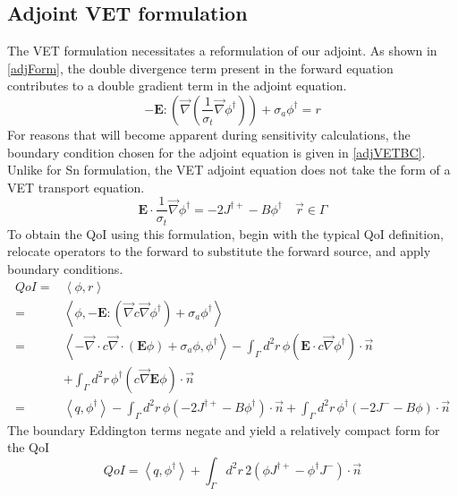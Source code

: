 \documentclass{article}
\newcommand{\vr}{\vec{r}}
\newcommand{\bra}{\left\langle}
\newcommand{\ket}{\right\rangle}
\newcommand{\vdiv}{\vec{\nabla} \cdot}
\newcommand{\vgrad}{\vec{\nabla}}
\newcommand{\Edd}{\mathbf{E}}
\newcommand{\sigt}{\sigma_t}
\newcommand{\siga}{\sigma_a}
\newcommand{\isigt}{c}
\newcommand{\scalSource}{q}
\newcommand{\scalResp}{r}
\begin{document}
\subsection{Adjoint VET formulation}
The VET formulation necessitates a reformulation of our adjoint. As shown in \ref{adjForm}, the double divergence term present in the forward equation contributes to a double gradient term in the adjoint equation.
\begin{equation}
\label{adjForm}
- \Edd : \left( \vgrad \left( \frac{1}{\sigt}\vgrad \phi^\dag \right) \right) + \siga \phi^\dag = \scalResp
\end{equation}
For reasons that will become apparent during sensitivity calculations, the boundary condition chosen for the adjoint equation is given in \ref{adjVETBC}. Unlike for Sn formulation, the VET adjoint equation does not take the form of a VET transport equation.
\begin{equation}
\label{adjVETBC}
\Edd \cdot \frac{1}{\sigma_{t} } \vec{\nabla} \phi^\dag  = - 2J^{\dag +} - B \phi^\dag \quad \vr \in \Gamma
\end{equation}
To obtain the QoI using this formulation, begin with the typical QoI definition, relocate operators to the forward to substitute the forward source, and apply boundary conditions.
\begin{equation}
\label{VETQoIAdjUnpDeriv}
\begin{split}
QoI=&\bra \phi , \scalResp \ket \\
=&\bra \phi , - \Edd : \left( \vgrad \isigt \vgrad \phi^\dag \right) + \siga \phi^\dag \ket \\
=& \bra - \vdiv \isigt \vdiv \left( \Edd \phi \right) + \siga \phi, \phi^\dag \ket 
- \int_\Gamma d^2 r \, \phi \left( \Edd \cdot \isigt \vgrad \phi^\dag \right) \cdot \vec{n}  \\ 
&+ \int_\Gamma d^2 r \, \phi^\dag \left(  \isigt \vgrad \Edd \phi \right) \cdot \vec{n} \\
=&\bra \scalSource , \phi^\dag \ket 
- \int_\Gamma d^2 r \, \phi \left( - 2J^{\dag +} - B \phi^\dag \right) \cdot \vec{n} + \int_\Gamma d^2 r \, \phi^\dag \left( - 2J^- - B \phi  \right) \cdot \vec{n}
\end{split}
\end{equation}
The boundary Eddington terms negate and yield a relatively compact form for the QoI
\begin{equation}
\label{VETQoIAdj}
QoI=\bra \scalSource , \phi^\dag \ket 
+ \int_\Gamma d^2 r \, 2  \left( \phi J^{\dag +}  - \phi^\dag J^- \right) \cdot \vec{n}
\end{equation}
\end{document}
